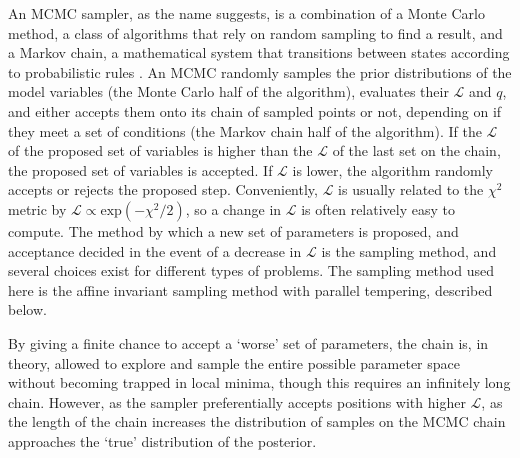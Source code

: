 An MCMC sampler, as the name suggests, is a combination of a Monte Carlo method, a class of algorithms that rely on random sampling to find a result, and a Markov chain, a mathematical system that transitions between states according to probabilistic rules \citep{foreman2012}.
An MCMC randomly samples the prior distributions of the model variables (the Monte Carlo half of the algorithm), evaluates their $\mathcal{L}$ and $q$, and either accepts them onto its chain of sampled points or not, depending on if they meet a set of conditions (the Markov chain half of the algorithm). If the $\mathcal{L}$ of the proposed set of variables is higher than the $\mathcal{L}$ of the last set on the chain, the proposed set of variables is accepted. If $\mathcal{L}$ is lower, the algorithm randomly accepts or rejects the proposed step.
Conveniently, $\mathcal{L}$ is usually related to the $\chi^2$ metric by $\mathcal{L} \propto \mathrm{exp}(-\chi^2/2)$, so a change in $\mathcal{L}$ is often relatively easy to compute.
The method by which a new set of parameters is proposed, and acceptance decided in the event of a decrease in $\mathcal{L}$ is the sampling method, and several choices exist for different types of problems. The sampling method used here is the affine invariant sampling method with parallel tempering, described below.

By giving a finite chance to accept a `worse' set of parameters, the chain is, in theory, allowed to explore and sample the entire possible parameter space without becoming trapped in local minima, though this requires an infinitely long chain.
However, as the sampler preferentially accepts positions with higher $\mathcal{L}$, as the length of the chain increases the distribution of samples on the MCMC chain approaches the `true' distribution of the posterior.


